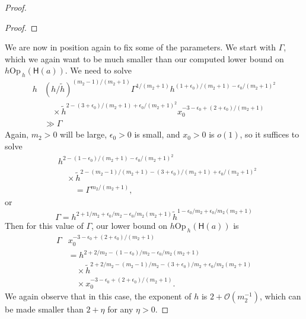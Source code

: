 \documentclass[twoside, final]{amsart}
\theoremstyle{definition}
\numberwithin{equation}{section}
\begin{document}
\begin{proof}
\begin{proof}
\end{proof}

We are now in position again to fix some of the parameters.  We start
with $\Gamma$, which we again want to be much smaller than our
computed lower bound on $h {\mathrm{Op}\,}_h({{\textsf{H}}} (a) )$.  We need to solve
\begin{align*}
h&  (h/{\tilde{h}})^{(m_2-1)/(m_2+1)} \Gamma^{1/(m_2 +1)} 
h^{ (1 + \epsilon_0)/(m_2 +1)  - \epsilon_0 / (m_2 +1)^2} \\
& \quad \times {\tilde{h}}^{ 2-  (3 + \epsilon_0)/(m_2 +1)  + \epsilon_0 / (m_2 +1)^2  }
x_0^{   -3  - \epsilon_0+ (2 + \epsilon_0)/(m_2 +1)   } \\ & \gg \Gamma
\end{align*}
Again, $m_2>0$ will be large, $\epsilon_0>0$ is small, and $x_0>0$ is
$o(1)$, so it suffices to solve
\begin{align*}
& h^{2 
 - (1 - \epsilon_0)/(m_2 +1)  - \epsilon_0 / (m_2 +1)^2} \\
& \quad \times 
{\tilde{h}}^{ 2    -(m_2-1)/(m_2+1)   -  (3 + \epsilon_0)/(m_2 +1)  + \epsilon_0 / (m_2 +1)^2  }
\\
& \quad \quad = \Gamma^{m_2/(m_2+1)},
\end{align*}
or
\[
\Gamma = h^{2 + 1/m_2 
  + \epsilon_0/m_2   - \epsilon_0 / m_2 (m_2 +1)} 
{\tilde{h}}^{ 1   -   \epsilon_0/m_2   +
  \epsilon_0 / m_2 (m_2 +1)  }
\]
Then for this value of $\Gamma$, our lower bound on $h
{\mathrm{Op}\,}_h({{\textsf{H}}}(a))$ is
\begin{align*}
\Gamma & x_0^{   -3  - \epsilon_0+ (2 + \epsilon_0)/(m_2 +1)   }  \\
& = h^{2 + 2/m_2 
 - (1 - \epsilon_0)/m_2   - \epsilon_0 / m_2 (m_2 +1)} \\
& \quad \times
{\tilde{h}}^{ 2 + 2/m_2   -(m_2-1)/m_2   -  (3 + \epsilon_0)/m_2   +
  \epsilon_0 / m_2 (m_2 +1)  } \\
& \quad \times x_0^{   -3  - \epsilon_0+ (2 +
  \epsilon_0)/(m_2 +1)   } .
\end{align*}
We again observe that in this case, the exponent of $h$ is $2 + {{\mathcal O}}(
m_2^{-1})$, which can be made smaller than $2 + \eta$ for any
$\eta>0$.


\end{proof}
\end{document}
